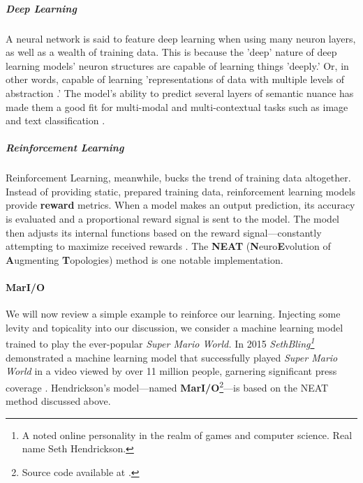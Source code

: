 \documentclass{report}
\newcommand{\tech}[1]{\textbf{#1}}
\begin{document}
\subparagraph{Deep Learning} 

A neural network is said to feature deep learning when using many neuron layers, as well as a wealth of training data. This is because the 'deep' nature of deep learning models' neuron structures are capable of learning things 'deeply.' Or, in other words, capable of learning 'representations of data with multiple levels of abstraction \cite{lecun2015deep}.' The model's ability to predict several layers of semantic nuance has made them a good fit for multi-modal and multi-contextual tasks such as image and text classification \cite{minaee2021deep}.

\subparagraph{Reinforcement Learning}

Reinforcement Learning, meanwhile, bucks the trend of training data altogether. Instead of providing static, prepared training data, reinforcement learning models provide \tech{reward} metrics. When a model makes an output prediction, its accuracy is evaluated and a proportional reward signal is sent to the model. The model then adjusts its internal functions based on the reward signal---constantly attempting to maximize received rewards \cite{kaelbling1996reinforcement}. The \tech{NEAT} (\textbf{N}euro\textbf{E}volution of  \textbf{A}ugmenting \textbf{T}opologies) method \cite{NEAT} is one notable implementation.


\paragraph{MarI/O}

We will now review a simple example to reinforce our learning. Injecting some levity and topicality into our discussion, we consider a machine learning model trained to play the ever-popular \emph{Super Mario World.} In 2015 \emph{SethBling\footnote{A noted online personality in the realm of games and computer science. Real name Seth Hendrickson.}} demonstrated a machine learning model that successfully played \emph{Super Mario World} \cite{sethbling} in a video viewed by over 11 million people, garnering significant press coverage \cite{Souppouris_2015} \cite{Gallagher_2015}. Hendrickson's model---named \tech{MarI/O}\footnote{Source code available at \cite{Hendrickson_2015}.}---is based on the NEAT method discussed above.
\end{document}
